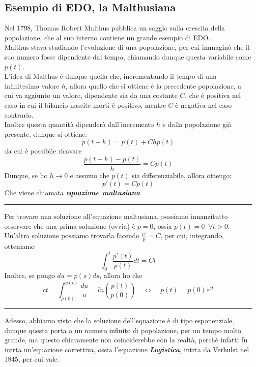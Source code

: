\documentclass{article}
\theoremstyle{definition}
\newcommand{\linea}{\vspace{15pt}\hrule\vspace{15pt}}
\begin{document}
\subsection{Esempio di EDO, la Malthusiana}
Nel 1798, Thomas Robert Malthus pubblica un saggio sulla crescita della popolazione, che al suo interno contiene un grande esempio di EDO.
\\
Malthus stava studiando l'evoluzione di una popolazione, per cui immaginò che il suo numero fosse dipendente dal tempo, chiamando dunque questa variabile come $p(t)$.
\\
L'idea di Malthus è dunque quella che, incrementando il tempo di una infinitesimo valore $h$, allora quello che si ottiene è la precedente popolazione, a cui va aggiunto un valore, dipendente sia da una costante $C$, che è positiva nel caso in cui il bilancio nascite morti è positivo, mentre $C$ è negativa nel caso contrario.
\\
Inoltre questa quantità dipenderà dall'incremento $h$ e dalla popolazione già presente, dunque si ottiene:
\begin{equation}
    p(t+h)=p(t)+Chp(t)
\end{equation}
da cui è possibile ricavare
\begin{equation}
    \frac{p(t+h)-p(t)}{h}=Cp(t)
\end{equation}
Dunque, se ho $h \to 0$ e assumo che $p(t)$ sia differenziabile, allora ottengo:
\begin{equation}
    p'(t)=Cp(t)
\end{equation}
Che viene chiamata \textit{\textbf{equazione maltusiana}}
\linea
Per trovare una soluzione all'equazione maltusiana, possiamo innanzitutto osservare che una prima soluzione (ovvia) è $p=0$, ossia $p(t)=0 \,\,\, \forall t > 0$.
\\
Un'altra soluzione possiamo trovarla facendo $\frac{p'}{p}=C$, per cui, integrando, otteniamo
\begin{equation}
    \int_0^t \frac{p'(t)}{p(t)}dt=Ct
\end{equation}
Inoltre, se pongo $du=p(s)ds$, allora ho che
\begin{equation}
    ct=\int_{p(0)}^{p(t)}\frac{du}{u}=ln\left(\frac{p(t)}{p(0)}\right) \,\,\,\,\,\, \Longleftrightarrow \,\,\,\,\,\, p(t)=p(0)e^{ct}
\end{equation}
\linea
Adesso, abbiamo visto che la soluzione dell'equazione è di tipo esponenziale, dunque questa porta a un numero infinito di popolazione, per un tempo molto grande, ma questo chiaramente non coinciderebbe con la realtà, perchè infatti fu intrta un'equazione correttiva, ossia l'equazione \textbf{\textit{Logistica}}, intrta da Verhulst nel 1845, per cui vale:
\end{document}
